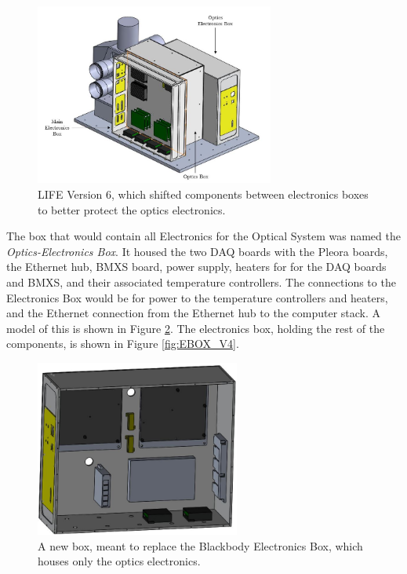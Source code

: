\begin{figure}
    \centering
    \includegraphics[width=0.7\textwidth]{chap3_images/LIFE_V6_images/LIFE_V6_img2_labelled.JPG}
    \caption{LIFE Version 6, which shifted components between electronics boxes to better protect the optics electronics.}
    \label{fig:LIFE_V6}
\end{figure}

The box that would contain all Electronics for the Optical System was named the \textit{Optics-Electronics Box}. It housed the two DAQ boards with the Pleora boards, the Ethernet hub, BMXS board, power supply, heaters for for the DAQ boards and BMXS, and their associated temperature controllers. The connections to the Electronics Box would be for power to the temperature controllers and heaters, and the Ethernet connection from the Ethernet hub to the computer stack. A model of this is shown in Figure \ref{fig:OPTOEBOX_V1}. The electronics box, holding the rest of the components, is shown in Figure \ref{fig:EBOX_V4}.

\begin{figure}
    \centering
    \includegraphics[width=0.6\textwidth]{chap3_images/LIFE_V6_images/optoebox_V1.JPG}
    \caption{A new box, meant to replace the Blackbody Electronics Box, which houses only the optics electronics.}
    \label{fig:OPTOEBOX_V1}
\end{figure}

